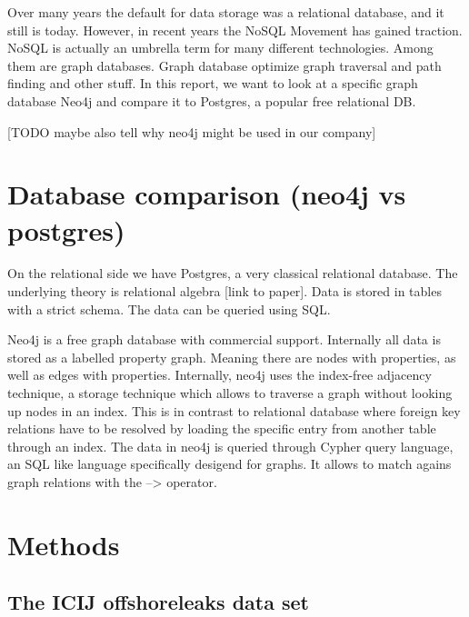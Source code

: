 \documentclass[11pt, a4paper,oneside,chapterprefix=false]{scrbook}
\begin{document}
Over many years the default for data storage was a relational database, and it still is today. 
However, in recent years the NoSQL Movement has gained traction.
NoSQL is actually an umbrella term for many different technologies.
Among them are graph databases.
Graph database optimize graph traversal and path finding and other stuff.
In this report, we want to look at a specific graph database Neo4j and compare it to Postgres, a popular free relational DB.

[TODO maybe also tell why neo4j might be used in our company]

\chapter{Database comparison (neo4j vs postgres)} \label{chp:theory}

On the relational side we have Postgres, a very classical relational database.
The underlying theory is relational algebra [link to paper].
Data is stored in tables with a strict schema.
The data can be queried using SQL.

Neo4j is a free graph database with commercial support.
Internally all data is stored as a labelled property graph.
Meaning there are nodes with properties, as well as edges with properties.
Internally, neo4j uses the index-free adjacency technique, a storage technique which allows to traverse a graph without looking up nodes in an index.
This is in contrast to relational database where foreign key relations have to be resolved by loading the specific entry from another table through an index.
The data in neo4j is queried through Cypher query language, an SQL like language specifically desigend for graphs.
It allows to match agains graph relations with the --> operator.

\chapter{Methods} \label{chp:methods}


\section{The ICIJ offshoreleaks data set} \label{sec:dataset}
\end{document}
